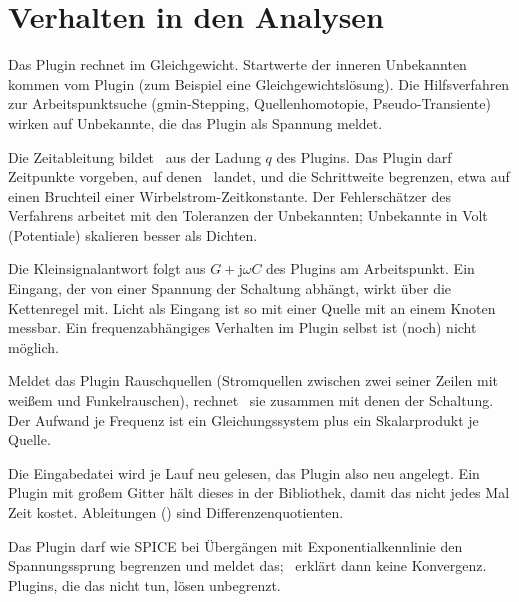 \section{Verhalten in den Analysen}
\label{sec:plugin-analysen}

\begin{description}[style=nextline,leftmargin=2em]
  \item[\code{op}, \code{dc}] Das Plugin rechnet im Gleichgewicht. Startwerte
    der inneren Unbekannten kommen vom Plugin (zum Beispiel eine
    Gleichgewichtslösung). Die Hilfsverfahren zur Arbeitspunktsuche
    (gmin-Stepping, Quellenhomotopie, Pseudo-Transiente) wirken auf
    Unbekannte, die das Plugin als Spannung meldet.
  \item[\code{tran}] Die Zeitableitung bildet \esim\ aus der Ladung $q$ des
    Plugins. Das Plugin darf Zeitpunkte vorgeben, auf denen \esim\ landet,
    und die Schrittweite begrenzen, etwa auf einen Bruchteil einer
    Wirbelstrom-Zeitkonstante. Der Fehlerschätzer des Verfahrens arbeitet mit
    den Toleranzen der Unbekannten; Unbekannte in Volt (Potentiale) skalieren
    besser als Dichten.
  \item[\code{ac}] Die Kleinsignalantwort folgt aus $G+\mathrm{j}\omega C$ des
    Plugins am Arbeitspunkt. Ein Eingang, der von einer Spannung der Schaltung
    abhängt, wirkt über die Kettenregel mit. Licht als Eingang ist so mit einer
    Quelle mit  an einem Knoten messbar. Ein
    frequenzabhängiges Verhalten im Plugin selbst ist (noch) nicht möglich.
  \item[\code{noise}] Meldet das Plugin Rauschquellen (Stromquellen zwischen
    zwei seiner Zeilen mit weißem und Funkelrauschen), rechnet \esim\ sie
    zusammen mit denen der Schaltung. Der Aufwand je Frequenz ist ein
    Gleichungssystem plus ein Skalarprodukt je Quelle.
  \item[\code{sens}, \code{param\_sweep}, \code{monte\_carlo}] Die Eingabedatei
    wird je Lauf neu gelesen, das Plugin also neu angelegt. Ein Plugin mit
    großem Gitter hält dieses in der Bibliothek, damit das nicht jedes Mal
    Zeit kostet. Ableitungen () sind Differenzenquotienten.
  \item[Newton-Verfahren] Das Plugin darf wie SPICE bei Übergängen mit
    Exponentialkennlinie den Spannungssprung begrenzen und meldet das; \esim\ 
    erklärt dann keine Konvergenz. Plugins, die das nicht tun, lösen
    unbegrenzt.
\end{description}

